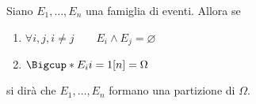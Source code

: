 \documentclass{subfiles}
\begin{document}
Siano $E_{1}, \ldots, E_{n}$ una famiglia di eventi. Allora se
\begin{enumerate}
    \item $\forall i, j, i \neq j \qquad E_{i} \land E_{j} = \varnothing$
    \item $\Bigcup*{E_{i}}{i = 1}[n] = \Omega$
\end{enumerate}
si dirà che $E_{1}, \ldots, E_{n}$ formano una partizione di $\Omega$.
\end{document}
